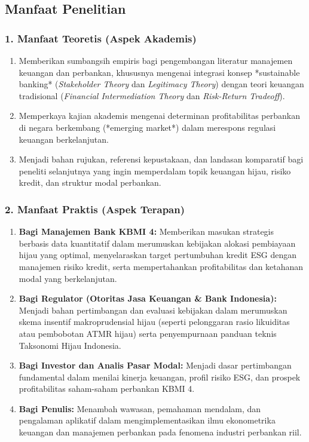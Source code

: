 \documentclass[12pt,a4paper]{article}
\numberwithin{equation}{section}
\begin{document}
\subsection{Manfaat Penelitian}

\subsubsection{1. Manfaat Teoretis (Aspek Akademis)}
\begin{enumerate}[label=\alph*.]
  \item Memberikan sumbangsih empiris bagi pengembangan literatur manajemen keuangan dan perbankan, khususnya mengenai integrasi konsep *sustainable banking* (\emph{Stakeholder Theory} dan \emph{Legitimacy Theory}) dengan teori keuangan tradisional (\emph{Financial Intermediation Theory} dan \emph{Risk-Return Tradeoff}).
  \item Memperkaya kajian akademis mengenai determinan profitabilitas perbankan di negara berkembang (*emerging market*) dalam merespons regulasi keuangan berkelanjutan.
  \item Menjadi bahan rujukan, referensi kepustakaan, dan landasan komparatif bagi peneliti selanjutnya yang ingin memperdalam topik keuangan hijau, risiko kredit, dan struktur modal perbankan.
\end{enumerate}

\subsubsection{2. Manfaat Praktis (Aspek Terapan)}
\begin{enumerate}[label=\alph*.]
  \item \textbf{Bagi Manajemen Bank KBMI 4:} Memberikan masukan strategis berbasis data kuantitatif dalam merumuskan kebijakan alokasi pembiayaan hijau yang optimal, menyelaraskan target pertumbuhan kredit ESG dengan manajemen risiko kredit, serta mempertahankan profitabilitas dan ketahanan modal yang berkelanjutan.
  \item \textbf{Bagi Regulator (Otoritas Jasa Keuangan \& Bank Indonesia):} Menjadi bahan pertimbangan dan evaluasi kebijakan dalam merumuskan skema insentif makroprudensial hijau (seperti pelonggaran rasio likuiditas atau pembobotan ATMR hijau) serta penyempurnaan panduan teknis Taksonomi Hijau Indonesia.
  \item \textbf{Bagi Investor dan Analis Pasar Modal:} Menjadi dasar pertimbangan fundamental dalam menilai kinerja keuangan, profil risiko ESG, dan prospek profitabilitas saham-saham perbankan KBMI 4.
  \item \textbf{Bagi Penulis:} Menambah wawasan, pemahaman mendalam, dan pengalaman aplikatif dalam mengimplementasikan ilmu ekonometrika keuangan dan manajemen perbankan pada fenomena industri perbankan riil.
\end{enumerate}
\end{document}
